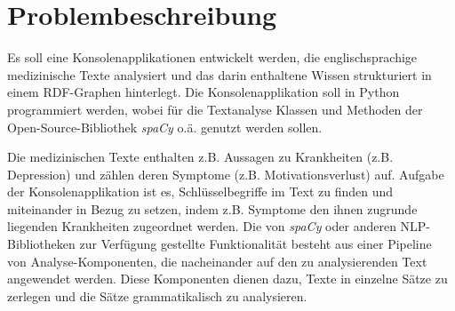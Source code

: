 \section{Problembeschreibung}
\label{sec:problembeschreibung}

Es soll eine Konsolenapplikationen entwickelt werden, die englischsprachige medizinische Texte analysiert und das darin enthaltene Wissen strukturiert in einem RDF-Graphen hinterlegt. Die Konsolenapplikation soll in Python programmiert werden, wobei für die Textanalyse Klassen und Methoden der Open-Source-Bibliothek \emph{spaCy} o.ä. genutzt werden sollen.

Die medizinischen Texte enthalten z.B. Aussagen zu Krankheiten (z.B. Depression) und zählen deren Symptome (z.B. Motivationsverlust) auf. Aufgabe der Konsolenapplikation ist es, Schlüsselbegriffe im Text zu finden und miteinander in Bezug zu setzen, indem z.B. Symptome den ihnen zugrunde liegenden Krankheiten zugeordnet werden. Die von \emph{spaCy} oder anderen NLP-Bibliotheken zur Verfügung gestellte Funktionalität besteht aus einer Pipeline von Analyse-Komponenten, die nacheinander auf den zu analysierenden Text angewendet werden. Diese Komponenten dienen dazu, Texte in einzelne Sätze zu zerlegen und die Sätze grammatikalisch zu analysieren.

